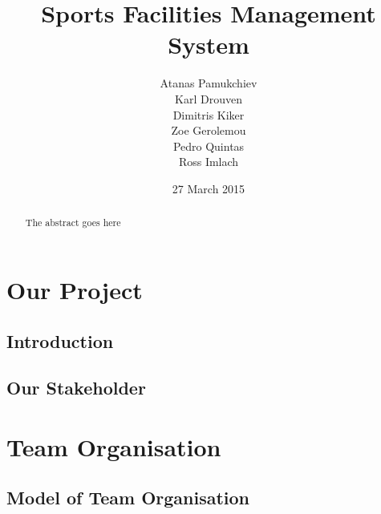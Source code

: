 \documentclass{l3proj}
\begin{document}
\title{Sports Facilities Management System}
\author{Atanas Pamukchiev \\
        Karl Drouven \\
        Dimitris Kiker \\
        Zoe Gerolemou \\
        Pedro Quintas\\
        Ross Imlach}
\date{27 March 2015}
\maketitle
\begin{abstract}

The abstract goes here

\end{abstract}
\educationalconsent
\tableofcontents

\chapter{Our Project}
\label{ourproject}

\section{Introduction}

\section{Our Stakeholder}

\chapter{Team Organisation}
\label{teamorganisation}

\section{Model of Team Organisation}

\end{document}
